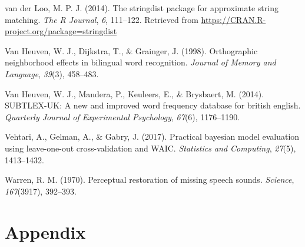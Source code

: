 \documentclass[
  english,
  man,floatsintext]{apa6}
\newlength{\cslhangindent}
\newenvironment{CSLReferences}[2] %
 {%
  \setlength{\parindent}{0pt}
  \ifodd #1 \everypar{\setlength{\hangindent}{\cslhangindent}}\ignorespaces\fi
  \ifnum #2 > 0
  \setlength{\parskip}{#2\baselineskip}
  \fi
 }%
 {}
\begin{document}
\begin{CSLReferences}{1}{0}
\leavevmode{}%
van der Loo, M. P. J. (2014). The stringdist package for approximate string matching. \emph{The {R} {J}ournal}, \emph{6}, 111--122. Retrieved from \url{https://CRAN.R-project.org/package=stringdist}

\leavevmode{}%
Van Heuven, W. J., Dijkstra, T., \& Grainger, J. (1998). Orthographic neighborhood effects in bilingual word recognition. \emph{Journal of Memory and Language}, \emph{39}(3), 458--483.

\leavevmode{}%
Van Heuven, W. J., Mandera, P., Keuleers, E., \& Brysbaert, M. (2014). SUBTLEX-UK: A new and improved word frequency database for british english. \emph{Quarterly Journal of Experimental Psychology}, \emph{67}(6), 1176--1190.

\leavevmode{}%
Vehtari, A., Gelman, A., \& Gabry, J. (2017). Practical bayesian model evaluation using leave-one-out cross-validation and WAIC. \emph{Statistics and Computing}, \emph{27}(5), 1413--1432.

\leavevmode{}%
Warren, R. M. (1970). Perceptual restoration of missing speech sounds. \emph{Science}, \emph{167}(3917), 392--393.

\end{CSLReferences}

\endgroup

\newpage

\hypertarget{appendix}{%
\section{Appendix}\label{appendix}}
\end{document}
